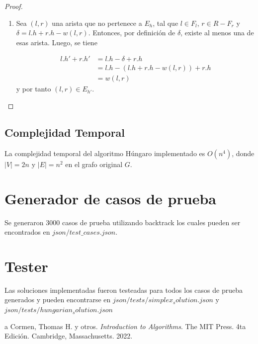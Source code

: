 \documentclass[10pt]{article} %
\begin{document}
\begin{proof}
\begin{enumerate}
		Se conoce que para $l \in F_l$ y $r \in F_r$ se cumple $l.h' + r.h' = l.h + r.h$. En caso contrario, cuando $l \in L-F_l$ y $r \in R-F_r$, se tiene que $l.h' = l.h$ y $r.h'=r.h$, entonces $l.h' + r.h' = l.h + r.h$. Por tanto, si la arista $(l,r)$ est\'a en el emparejamiento $M$ para el grafo $G_h$, entonces $(l,r) \in E_{h'}$.
		\item Sea $(l,r)$ una arista que no pertenece a $E_h$, tal que $l \in F_l$, $r \in R-F_r$ y $\delta = l.h + r.h - w(l,r)$. Entonces, por definici\'on de $\delta$, existe al menos una de esas arista. Luego, se tiene 
		
		\begin{align*}
			l.h' + r.h' &= l.h - \delta + r.h\\
			&= l.h - (l.h + r.h -w(l,r)) + r.h\\
			&= w(l,r)			
		\end{align*}
		y por tanto $(l,r) \in E_{h'}$. 
		
		
	\end{enumerate}
	
\end{proof}


\subsection{Complejidad Temporal}

La complejidad temporal del algoritmo H\'ungaro implementado es $O(n^4)$, donde $|V|=2n$ y $|E|=n^2$ en el grafo original $G$.
	
	\section{Generador de casos de prueba}
	
	Se generaron 3000 casos de prueba utilizando backtrack los cuales pueden ser encontrados en $ json/test\_cases.json $.
	
	\section{Tester}
	 Las soluciones implementadas fueron testeadas para todos los casos de prueba generados y pueden encontrarse en $ json/tests/simplex_solution.json $ y $ json/tests/hungarian_solution.json $
	
	
	\begin{thebibliography}
		a
		 Cormen, Thomas H. y otros. \emph{Introduction to Algorithms}. 
		The MIT Press.
		4ta Edici\'on.		
		Cambridge, Massachusetts.
		2022.
	\end{thebibliography}
\end{document}
